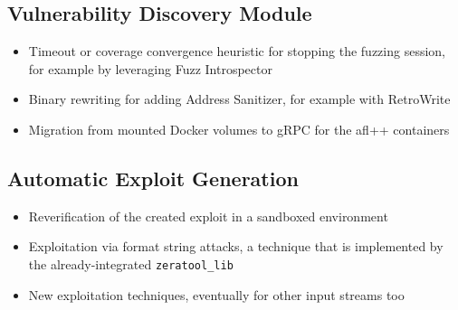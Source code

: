 \documentclass[../main.tex]{subfiles}
\begin{document}
\hypertarget{vulnerability-discovery-module}{%
\subsection{Vulnerability Discovery
Module}\label{vulnerability-discovery-module}}

\begin{itemize}
\tightlist
\item
  Timeout or coverage convergence heuristic for stopping the fuzzing
  session, for example by leveraging Fuzz Introspector
\item
  Binary rewriting for adding Address Sanitizer, for example with
  RetroWrite
\item
  Migration from mounted Docker volumes to gRPC for the afl++ containers
\end{itemize}

\hypertarget{automatic-exploit-generation}{%
\subsection{Automatic Exploit
Generation}\label{automatic-exploit-generation}}

\begin{itemize}
\tightlist
\item
  Reverification of the created exploit in a sandboxed environment
\item
  Exploitation via format string attacks, a technique that is
  implemented by the already-integrated \texttt{zeratool\_lib}
\item
  New exploitation techniques, eventually for other input streams too
\end{itemize}
\end{document}
